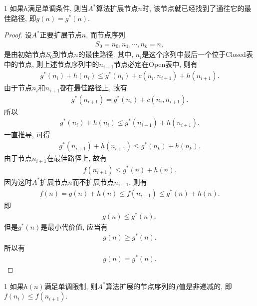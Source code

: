\begin{mythm}{}{1}
如果$h$满足单调条件, 则当$A^*$算法扩展节点$n$时, 该节点就已经找到了通往它的最佳路径, 即$g(n)=g^*(n)$.
\end{mythm}
\begin{proof}
设$A^*$正要扩展节点$n$, 而节点序列
\begin{align}
  S_0=n_0, n_1,\cdots,n_k=n,
\end{align}
是由初始节点$S_0$到节点$n$的最佳路径. 其中, $n_i$是这个序列中最后一个位于Closed表中的节点, 则上述节点序列中的$n_{i+1}$节点必定在Open表中, 则有
\begin{align}
  g^*(n_i)+h(n_i)\leq g^*(n_i) +c(n_i, n_{i+1}) +h(n_{i+1}).
\end{align}
由于节点$n_i$和$n_{i+1}$都在最佳路径上, 故有
\begin{align}
  g^*( n_{i+1} )=g^*(n_i )+c(n_i, n_{i+1}).
\end{align}
所以
\begin{align}
g^*(n_i )+h(n_i )\leq g^*( n_{i+1}) +h(n_{i+1}).
\end{align}
一直推导, 可得
\begin{align}
  g^*( n_{i+1} )+h(n_{i+1})\leq g^*( n_k) +h(n_k).
\end{align}
由于节点$n_{i+1}$在最佳路径上, 故有
\begin{align}
  f( n_{i+1} )\leq g^*(n) +h(n).
\end{align}
因为这时$A^*$扩展节点$n$而不扩展节点$n_{i+1}$, 则有
\begin{align}
  f(n)=g(n)+h(n)\leq f( n_{i+1} )\leq g^*(n)+h(n).
\end{align}
即
\begin{align}
  g(n)\leq g^*(n),
\end{align}
但是$g^*(n)$是最小代价值, 应当有
\begin{align}
  g(n)\geq g^*(n).
\end{align}
所以有
\begin{align}
  g(n)=g^*(n).
\end{align}
\end{proof}
\begin{mythm}{}{1}
如果$h(n)$满足单调限制, 则$A^*$算法扩展的节点序列的$f$值是非递减的, 即$f(n_i)\leq f(n_{i+1} )$.
\end{mythm}
